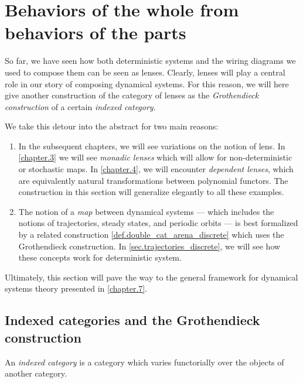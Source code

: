 \documentclass[DynamicalBook]{subfiles}
\begin{document}
{%
\section{Behaviors of the whole from behaviors of the parts}\label{sec.representables}


  So far, we have seen how both deterministic systems and the wiring diagrams we
  used to compose them can be seen as lenses. Clearly, lenses will play a
  central role in our story of composing dynamical systems. For this reason, we
  will here give another construction of the category of lenses as the
  \emph{Grothendieck construction} of a certain \emph{indexed category}.

  We take this detour into the abstract for two main reasons:
  \begin{enumerate}
    \item In the subsequent chapters, we will see variations on the notion of
      lens. In \cref{chapter.3} we will see \emph{monadic lenses} which
      will allow for non-deterministic or stochastic maps. In \cref{chapter.4},
      we will encounter \emph{dependent lenses}, which are equivalently natural
      transformations between polynomial functors. The construction in this
      section will generalize elegantly to all these examples.
    \item The notion of a \emph{map} between dynamical systems --- which
      includes the notions of trajectories, steady states, and periodic orbits
      --- is best formalized by a related construction \cref{def.double_cat_arena_discrete} which uses the
      Grothendieck construction. In \cref{sec.trajectories_discrete}, we will
      see how these concepts work for deterministic system.
  \end{enumerate}
  Ultimately, this section will pave the way to the general framework for
  dynamical systems theory presented in \cref{chapter.7}.

\subsection{Indexed categories and the Grothendieck construction}\label{sec.indexed_categories}

An \emph{indexed category} is a category which varies functorially over the
objects of another category.

}
\end{document}
